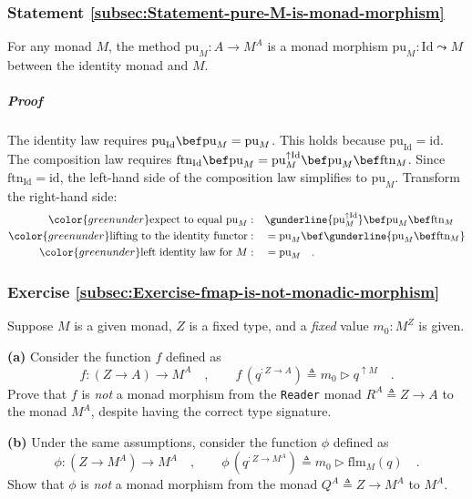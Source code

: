 \subsubsection{Statement \label{subsec:Statement-pure-M-is-monad-morphism}\ref{subsec:Statement-pure-M-is-monad-morphism}}

For any monad $M$, the method $\text{pu}_{M}:A\rightarrow M^{A}$
is a monad morphism $\text{pu}_{M}:\text{Id}\leadsto M$ between the
identity monad and $M$.

\subparagraph{Proof}

The identity law requires $\text{pu}_{\text{Id}}\bef\text{pu}_{M}=\text{pu}_{M}$.
This holds because $\text{pu}_{\text{Id}}=\text{id}$. The composition
law requires $\text{ftn}_{\text{Id}}\bef\text{pu}_{M}=\text{pu}_{M}^{\uparrow\text{Id}}\bef\text{pu}_{M}\bef\text{ftn}_{M}$.
Since $\text{ftn}_{\text{Id}}=\text{id}$, the left-hand side of the
composition law simplifies to $\text{pu}_{M}$. Transform the right-hand
side:
\begin{align*}
{\color{greenunder}\text{expect to equal }\text{pu}_{M}:}\quad & \gunderline{\text{pu}_{M}^{\uparrow\text{Id}}}\bef\text{pu}_{M}\bef\text{ftn}_{M}\\
{\color{greenunder}\text{lifting to the identity functor}:}\quad & =\text{pu}_{M}\bef\gunderline{\text{pu}_{M}\bef\text{ftn}_{M}}\\
{\color{greenunder}\text{left identity law for }M:}\quad & =\text{pu}_{M}\quad.
\end{align*}


\subsubsection{Exercise \label{subsec:Exercise-fmap-is-not-monadic-morphism}\ref{subsec:Exercise-fmap-is-not-monadic-morphism}}

Suppose $M$ is a given monad, $Z$ is a fixed type, and a \emph{fixed}
value $m_{0}:M^{Z}$ is given.

\textbf{(a)} Consider the function $f$ defined as
\[
f:\left(Z\rightarrow A\right)\rightarrow M^{A}\quad,\quad\quad f\,(q^{:Z\rightarrow A})\triangleq m_{0}\triangleright q^{\uparrow M}\quad.
\]
Prove that $f$ is \emph{not} a monad morphism from the \lstinline!Reader!
monad $R^{A}\triangleq Z\rightarrow A$ to the monad $M^{A}$, despite
having the correct type signature.

\textbf{(b)} Under the same assumptions, consider the function $\phi$
defined as
\[
\phi:(Z\rightarrow M^{A})\rightarrow M^{A}\quad,\quad\quad\phi\,(q^{:Z\rightarrow M^{A}})\triangleq m_{0}\triangleright\text{flm}_{M}(q)\quad.
\]
Show that $\phi$ is \emph{not} a monad morphism from the monad $Q^{A}\triangleq Z\rightarrow M^{A}$
to $M^{A}$.

